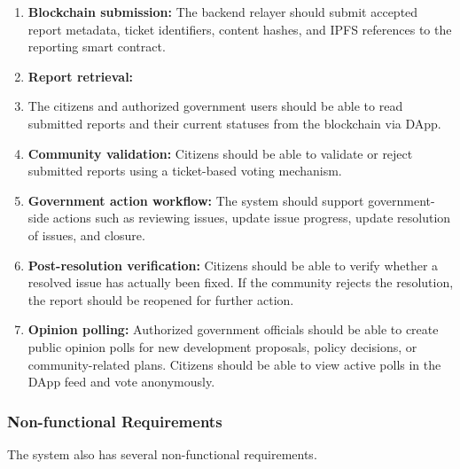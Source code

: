 \begin{enumerate}
    \item \textbf{Blockchain submission:}
    The backend relayer should submit accepted report metadata, ticket identifiers, 
    content hashes, and IPFS references to the reporting smart contract.

    \item \textbf{Report retrieval:}
    \item The citizens and authorized government users should be able to  read submitted reports and their current statuses from the blockchain via DApp.
    
    \item \textbf{Community validation:}
    Citizens should be able to validate or reject submitted reports using a 
    ticket-based voting mechanism.

    \item \textbf{Government action workflow:}
    The system should support government-side actions such as reviewing issues, update issue progress, update resolution of issues, and closure.

    \item \textbf{Post-resolution verification:}
    Citizens should be able to verify whether a resolved issue has actually been fixed. If the community rejects the resolution, the report should be reopened for further action.

    \item \textbf{Opinion polling:}
    Authorized government officials should be able to create public opinion polls for
    new development proposals, policy decisions, or community-related plans. Citizens should be able to view active polls in the DApp feed and vote anonymously. 
\end{enumerate}

\subsubsection{Non-functional Requirements}

The system also has several non-functional requirements.

